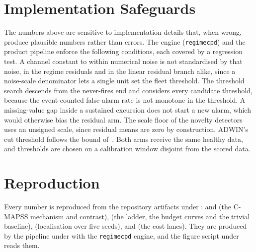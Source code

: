 \documentclass[journal]{IEEEtran}
\begin{document}
\appendices

\section{Implementation Safeguards}\label{app:safeguards}

The numbers above are sensitive to implementation details that, when wrong, produce plausible numbers
rather than errors. The engine (\texttt{regimecpd}) and the product pipeline enforce the following
conditions, each covered by a regression test. A channel constant to within numerical noise is not
standardised by that noise, in the regime residuals and in the linear residual branch alike, since a
noise-scale denominator lets a single unit set the fleet threshold. The threshold search descends from the
never-fires end and considers every candidate threshold, because the event-counted false-alarm rate is not
monotone in the threshold. A missing-value gap inside a sustained excursion does not start a new alarm,
which would otherwise bias the residual arm. The scale floor of the novelty detectors uses an unsigned
scale, since residual means are zero by construction. ADWIN's cut threshold follows the bound
of~\cite{bifet2007}. Both arms receive the same healthy data, and thresholds are chosen on a calibration
window disjoint from the scored data.

\section{Reproduction}\label{app:repro}

Every number is reproduced from the repository artifacts under :
 and  (the C-MAPSS mechanism and contrast),
 (the ladder, the budget curves and the trivial baseline),
 (localisation over five seeds),  and
 (the cost lanes). They are produced by the pipeline under  with
the \texttt{regimecpd} engine, and the figure script under
 reads them.

\balance
\end{document}
